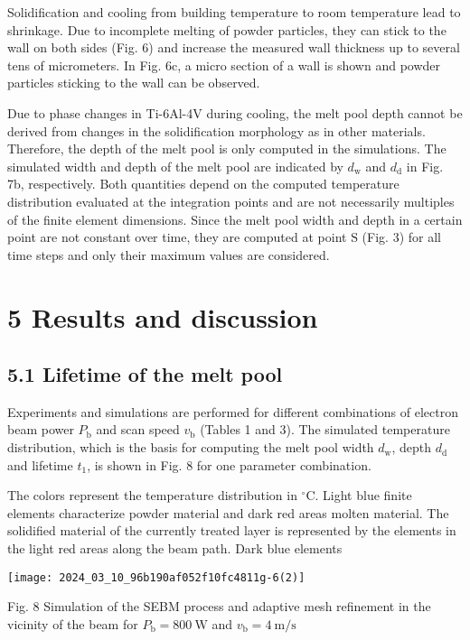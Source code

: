 \documentclass[10pt]{article}
\begin{document}
Solidification and cooling from building temperature to room temperature lead to shrinkage. Due to incomplete melting of powder particles, they can stick to the wall on both sides (Fig. 6) and increase the measured wall thickness up to several tens of micrometers. In Fig. 6c, a micro section of a wall is shown and powder particles sticking to the wall can be observed.

Due to phase changes in Ti-6Al-4V during cooling, the melt pool depth cannot be derived from changes in the solidification morphology as in other materials. Therefore, the depth of the melt pool is only computed in the simulations. The simulated width and depth of the melt pool are indicated by $d_{\mathrm{w}}$ and $d_{\mathrm{d}}$ in Fig. 7b, respectively. Both quantities depend on the computed temperature distribution evaluated at the integration points and are not necessarily multiples of the finite element dimensions. Since the melt pool width and depth in a certain point are not constant over time, they are computed at point $\mathrm{S}$ (Fig. 3) for all time steps and only their maximum values are considered.

\section*{5 Results and discussion}
\subsection*{5.1 Lifetime of the melt pool}
Experiments and simulations are performed for different combinations of electron beam power $P_{\mathrm{b}}$ and scan speed $v_{\mathrm{b}}$ (Tables 1 and 3). The simulated temperature distribution, which is the basis for computing the melt pool width $d_{\mathrm{w}}$, depth $d_{\mathrm{d}}$ and lifetime $t_{1}$, is shown in Fig. 8 for one parameter combination.

The colors represent the temperature distribution in ${ }^{\circ} \mathrm{C}$. Light blue finite elements characterize powder material and dark red areas molten material. The solidified material of the currently treated layer is represented by the elements in the light red areas along the beam path. Dark blue elements

\begin{center}
\texttt{[image: 2024\_03\_10\_96b190af052f10fc4811g-6(2)]}
\end{center}

Fig. 8 Simulation of the SEBM process and adaptive mesh refinement in the vicinity of the beam for $P_{\mathrm{b}}=800 \mathrm{~W}$ and $v_{\mathrm{b}}=4 \mathrm{~m} / \mathrm{s}$
\end{document}
